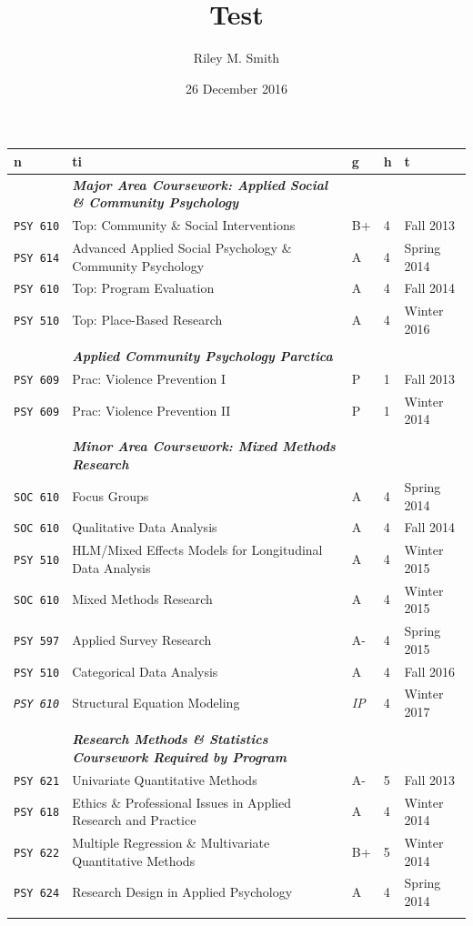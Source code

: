 \documentclass[]{tufte-book}
\title{Test}
\author{Riley M. Smith}
\date{26 December 2016}
\newcommand{\rowgroup}[1]{\hspace{-1em}#1}
\begin{document}
\maketitle




\begin{longtable}[]{@{}lllll@{}}
\toprule
n & ti & g & h & t\tabularnewline
\midrule
\endhead
&
\rowgroup{\textbf{\textit{Major Area Coursework: Applied Social \& Community Psychology}}}
& & &\tabularnewline
\texttt{PSY\ 610} & Top: Community \& Social Interventions & B+ & 4 &
Fall 2013\tabularnewline
\texttt{PSY\ 614} & Advanced Applied Social Psychology \& Community
Psychology & A & 4 & Spring 2014\tabularnewline
\texttt{PSY\ 610} & Top: Program Evaluation & A & 4 & Fall
2014\tabularnewline
\texttt{PSY\ 510} & Top: Place-Based Research & A & 4 & Winter
2016\tabularnewline
\midrule & & & &\tabularnewline
& \rowgroup{\textbf{\textit{Applied Community Psychology Parctica}}} & &
&\tabularnewline
\texttt{PSY\ 609} & Prac: Violence Prevention I & P & 1 & Fall
2013\tabularnewline
\texttt{PSY\ 609} & Prac: Violence Prevention II & P & 1 & Winter
2014\tabularnewline
\midrule & & & &\tabularnewline
&
\rowgroup{\textbf{\textit{Minor Area Coursework: Mixed Methods Research}}}
& & &\tabularnewline
\texttt{SOC\ 610} & Focus Groups & A & 4 & Spring 2014\tabularnewline
\texttt{SOC\ 610} & Qualitative Data Analysis & A & 4 & Fall
2014\tabularnewline
\texttt{PSY\ 510} & HLM/Mixed Effects Models for Longitudinal Data
Analysis & A & 4 & Winter 2015\tabularnewline
\texttt{SOC\ 610} & Mixed Methods Research & A & 4 & Winter
2015\tabularnewline
\texttt{PSY\ 597} & Applied Survey Research & A- & 4 & Spring
2015\tabularnewline
\texttt{PSY\ 510} & Categorical Data Analysis & A & 4 & Fall
2016\tabularnewline
\emph{\texttt{PSY\ 610}} & Structural Equation Modeling & \emph{IP} & 4
& Winter 2017\tabularnewline
\midrule & & & &\tabularnewline
&
\rowgroup{\textbf{\textit{Research Methods \& Statistics Coursework Required by Program}}}
& & &\tabularnewline
\texttt{PSY\ 621} & Univariate Quantitative Methods & A- & 5 & Fall
2013\tabularnewline
\texttt{PSY\ 618} & Ethics \& Professional Issues in Applied Research
and Practice & A & 4 & Winter 2014\tabularnewline
\texttt{PSY\ 622} & Multiple Regression \& Multivariate Quantitative
Methods & B+ & 5 & Winter 2014\tabularnewline
\texttt{PSY\ 624} & Research Design in Applied Psychology & A & 4 &
Spring 2014\tabularnewline
\midrule & & & &\tabularnewline
\bottomrule
\end{longtable}
\end{document}

